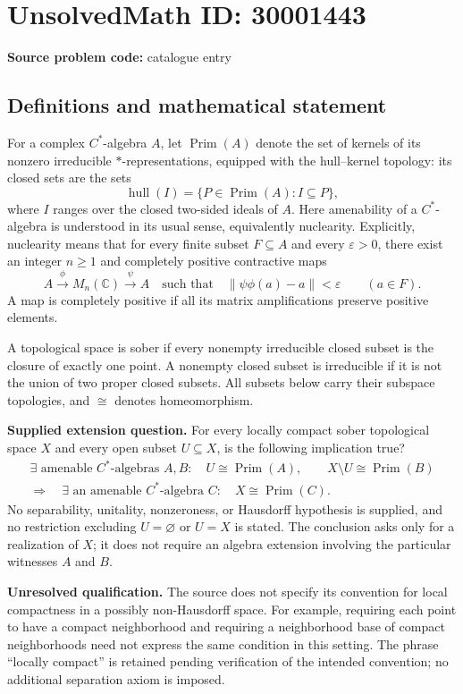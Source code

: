 \documentclass[11pt]{article}
\newcommand{\C}{\mathbb{C}}
\begin{document}
\section*{UnsolvedMath ID: 30001443}
\textbf{Source problem code:} catalogue entry
\subsection{Definitions and mathematical statement}
For a complex \(C^*\)-algebra \(A\), let \(\operatorname{Prim}(A)\) denote the set of kernels of its nonzero irreducible \(*\)-representations, equipped with the hull--kernel topology: its closed sets are the sets
\[
\operatorname{hull}(I)=\{P\in\operatorname{Prim}(A):I\subseteq P\},
\]
where \(I\) ranges over the closed two-sided ideals of \(A\). Here amenability of a \(C^*\)-algebra is understood in its usual sense, equivalently nuclearity. Explicitly, nuclearity means that for every finite subset \(F\subseteq A\) and every \(\varepsilon>0\), there exist an integer \(n\geq1\) and completely positive contractive maps
\[
A\xrightarrow{\phi}M_n(\C)\xrightarrow{\psi}A
\quad\text{such that}\quad
\|\psi\phi(a)-a\|<\varepsilon\qquad(a\in F).
\]
A map is completely positive if all its matrix amplifications preserve positive elements.

A topological space is sober if every nonempty irreducible closed subset is the closure of exactly one point. A nonempty closed subset is irreducible if it is not the union of two proper closed subsets. All subsets below carry their subspace topologies, and \(\cong\) denotes homeomorphism.

\textbf{Supplied extension question.} For every locally compact sober topological space \(X\) and every open subset \(U\subseteq X\), is the following implication true?
\[
\begin{gathered}
\exists\text{ amenable }C^*\text{-algebras }A,B:\quad
U\cong\operatorname{Prim}(A),\qquad
X\setminus U\cong\operatorname{Prim}(B)
\\[2pt]
\Longrightarrow\quad
\exists\text{ an amenable }C^*\text{-algebra }C:\quad
X\cong\operatorname{Prim}(C).
\end{gathered}
\]
No separability, unitality, nonzeroness, or Hausdorff hypothesis is supplied, and no restriction excluding \(U=\varnothing\) or \(U=X\) is stated. The conclusion asks only for a realization of \(X\); it does not require an algebra extension involving the particular witnesses \(A\) and \(B\).

\textbf{Unresolved qualification.} The source does not specify its convention for local compactness in a possibly non-Hausdorff space. For example, requiring each point to have a compact neighborhood and requiring a neighborhood base of compact neighborhoods need not express the same condition in this setting. The phrase ``locally compact'' is retained pending verification of the intended convention; no additional separation axiom is imposed.
\end{document}
